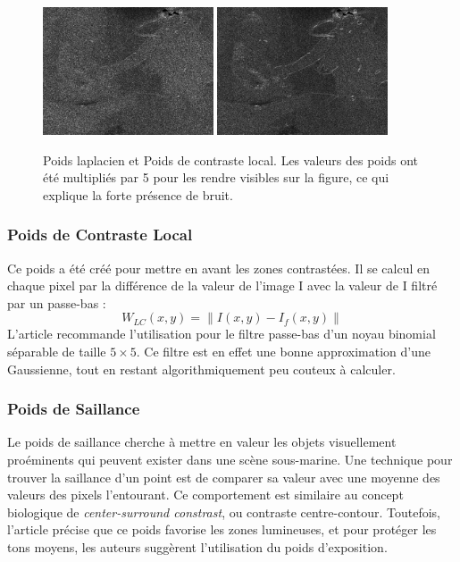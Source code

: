 \documentclass[twoside]{article}
\begin{document}
\begin{figure}[]
  \centering
  \includegraphics[width=0.45\textwidth]{Support/laplacian.png}
  \includegraphics[width=0.45\textwidth]{Support/lc.png}

  \caption{Poids laplacien et Poids de contraste local. Les valeurs des poids ont été multipliés par 5 pour les rendre visibles sur la figure, ce qui explique la forte présence de bruit.}
\end{figure}

\subsubsection{Poids de Contraste Local}

Ce poids a été créé pour mettre en avant les zones contrastées. Il se calcul en chaque pixel par la différence de la valeur de l'image I avec la valeur de I filtré par un passe-bas : $$ W_{LC}(x,y) = \|I(x,y) - I_{f}(x,y)\| $$
L'article recommande l'utilisation pour le filtre passe-bas d'un noyau binomial séparable de taille $5 \times 5$. Ce filtre est en effet une bonne approximation d'une Gaussienne, tout en restant algorithmiquement peu couteux à calculer.

\subsubsection{Poids de Saillance}
Le poids de saillance cherche à mettre en valeur les objets visuellement proéminents qui peuvent exister dans une scène sous-marine. Une technique pour trouver la saillance d'un point est de comparer sa valeur avec une moyenne des valeurs des pixels l'entourant. Ce comportement est similaire au concept biologique de \emph{center-surround constrast}, ou contraste centre-contour. Toutefois, l'article précise que ce poids favorise les zones lumineuses, et pour protéger les tons moyens, les auteurs suggèrent l'utilisation du poids d'exposition.
\end{document}
